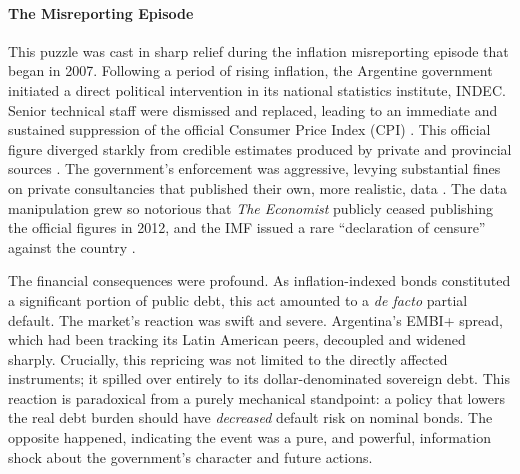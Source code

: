 \documentclass[12pt]{article}
\theoremstyle{plain}
\begin{document}
\paragraph{The Misreporting Episode}
This puzzle was cast in sharp relief during the inflation misreporting episode
that began in 2007. Following a period of rising inflation, the Argentine
government initiated a direct political intervention in its national statistics
institute, INDEC. Senior technical staff were dismissed and replaced, leading
to an immediate and sustained suppression of the official Consumer Price Index
(CPI) \citet{MorelliMoretti2023}. This official figure diverged starkly from
credible estimates produced by private and provincial sources
\citet{Cavallo2013}. The government's enforcement was aggressive, levying
substantial fines on private consultancies that published their own, more
realistic, data \citet{ReutersFines2013}. The data manipulation grew so
notorious that \textit{The Economist} publicly ceased publishing the official
figures in 2012, and the IMF issued a rare ``declaration of censure'' against
the country \citet{Economist2012, IMFPress2013}.

The financial consequences were profound. As inflation-indexed bonds
constituted a significant portion of public debt, this act amounted to a
\textit{de facto} partial default. The market's reaction was swift and severe.
Argentina's EMBI+ spread, which had been tracking its Latin American peers,
decoupled and widened sharply. Crucially, this repricing was not limited to the
directly affected instruments; it spilled over entirely to its
dollar-denominated sovereign debt. This reaction is paradoxical from a purely
mechanical standpoint: a policy that lowers the real debt burden should have
\textit{decreased} default risk on nominal bonds. The opposite happened,
indicating the event was a pure, and powerful, information shock about the
government's character and future actions.
\end{document}
